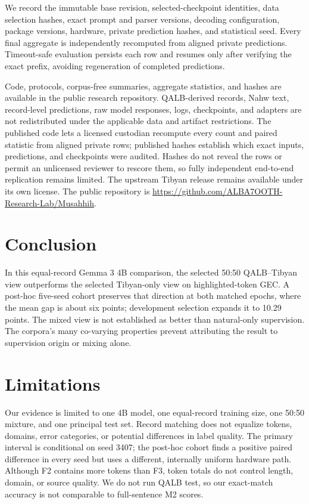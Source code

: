 \documentclass[11pt,a4paper]{article}
\begin{document}
We record the immutable base revision, selected-checkpoint identities, data
selection hashes, exact prompt and parser versions, decoding configuration,
package versions, hardware, private prediction hashes, and statistical seed.
Every final aggregate is independently recomputed from aligned private
predictions.  Timeout-safe evaluation persists each row and resumes only after
verifying the exact prefix, avoiding regeneration of completed predictions.

Code, protocols, corpus-free summaries, aggregate statistics, and hashes are
available in the public research repository.  QALB-derived records, Nahw text,
record-level predictions, raw model responses, logs, checkpoints, and adapters
are not redistributed under the applicable data and artifact restrictions.
The published code lets a licensed custodian recompute every count and paired
statistic from aligned private rows; published hashes establish which exact
inputs, predictions, and checkpoints were audited.  Hashes do not reveal the
rows or permit an unlicensed reviewer to rescore them, so fully independent
end-to-end replication remains limited.  The upstream Tibyan release remains
available under its own license.  The public repository is
\url{https://github.com/ALBA7OOTH-Research-Lab/Musahhih}.

\section{Conclusion}

In this equal-record Gemma 3 4B comparison, the selected 50:50
QALB--Tibyan view outperforms the selected Tibyan-only view on highlighted-token
GEC.  A post-hoc five-seed cohort preserves that direction at both matched
epochs, where the mean gap is about six points; development selection expands
it to 10.29 points.  The mixed view is not established as better than
natural-only supervision.  The corpora's many co-varying properties prevent
attributing the result to supervision origin or mixing alone.

\section{Limitations}

Our evidence is limited to one 4B model, one equal-record training size, one
50:50 mixture, and one principal test set.  Record matching does not equalize
tokens, domains, error categories, or potential differences in label quality.
The primary
interval is conditional on seed 3407; the
post-hoc cohort finds a positive paired difference in every seed but uses a
different, internally uniform hardware path.  Although F2 contains more
tokens than F3, token totals do not control length, domain, or source quality.
We do not run QALB test, so our exact-match accuracy is not comparable to
full-sentence M2 scores.
\end{document}
